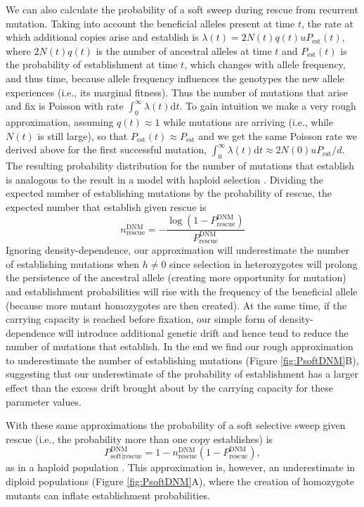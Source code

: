 \documentclass[]{article}
\begin{document}
We can also calculate the probability of a soft sweep during rescue from recurrent mutation.
Taking into account the beneficial alleles present at time $t$, the rate at which additional copies arise and establish is $\lambda(t) = 2 N(t) q(t) u P_\mathrm{est}(t)$, where $2 N(t) q(t)$ is the number of ancestral alleles at time $t$ and $P_\mathrm{est}(t)$ is the probability of establishment at time $t$, which changes with allele frequency, and thus time, because allele frequency influences the genotypes the new allele experiences (i.e., its marginal fitness).
Thus the number of mutations that arise and fix is Poisson with rate $\int_0^\infty \lambda(t) \mathrm{d} t$. 
To gain intuition we make a very rough approximation, assuming $q(t)\approx1$ while mutations are arriving (i.e., while $N(t)$ is still large), so that $P_\mathrm{est}(t)\approx P_\mathrm{est}$ and we get the same Poisson rate we derived above for the first successful mutation, $\int_0^\infty \lambda(t) \mathrm{d} t \approx 2N(0) u P_\mathrm{est}/d$.
The resulting probability distribution for the number of mutations that establish is analogous to the result in a model with haploid selection \citep[c.f., equation 7 in][]{wilson2017soft}.  
Dividing the expected number of establishing mutations by the probability of rescue, the expected number that establish given rescue is
\begin{equation}\label{eq:ENestDNM}
n^\mathrm{DNM}_\mathrm{rescue} = -\frac{\log(1-P_\mathrm{rescue}^\mathrm{DNM})}{P_\mathrm{rescue}^\mathrm{DNM}}
\end{equation}
Ignoring density-dependence, our approximation will underestimate the number of establishing mutations when $h\neq0$ since selection in heterozygotes will prolong the persistence of the ancestral allele (creating more opportunity for mutation) and establishment probabilities will rise with the frequency of the beneficial allele (because more mutant homozygotes are then created).
At the same time, if the carrying capacity is reached before fixation, our simple form of density-dependence will introduce additional genetic drift and hence tend to reduce the number of mutations that establish.
In the end we find our rough approximation to underestimate the number of establishing mutations (Figure \ref{fig:PsoftDNM}B), suggesting that our underestimate of the probability of establishment has a larger effect than the excess drift brought about by the carrying capacity for these parameter values.

With these same approximations the probability of a soft selective sweep given rescue (i.e., the probability more than one copy establishes) is 
\begin{equation}\label{eq:PsoftDNM}
P_{\mathrm{soft}|\mathrm{rescue}}^{\mathrm{DNM}} = 1 - n^\mathrm{DNM}_\mathrm{rescue} (1-P_{\mathrm{rescue}}^{\mathrm{DNM}}),
\end{equation}
as in a haploid population \citep[equation 8 in][]{wilson2017soft}.
This approximation is, however, an underestimate in diploid populations (Figure \ref{fig:PsoftDNM}A), where the creation of homozygote mutants can inflate establishment probabilities.
\end{document}
